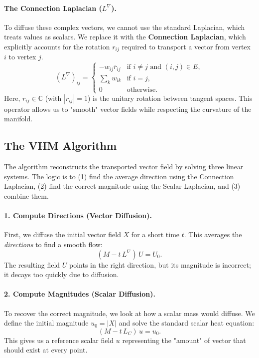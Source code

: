 \documentclass[11pt,a4paper]{article}
\begin{document}
\paragraph{The Connection Laplacian ($L^\nabla$).} 
To diffuse these complex vectors, we cannot use the standard Laplacian, which treats values as scalars. We replace it with the \textbf{Connection Laplacian}, which explicitly accounts for the rotation $r_{ij}$ required to transport a vector from vertex $i$ to vertex $j$.
\[
(L^{\nabla})_{ij} =
\begin{cases}
-w_{ij} \bar{r}_{ij} & \text{if } i \neq j \text{ and } (i,j) \in E,\\
\sum_{k} w_{ik} & \text{if } i=j,\\
0 & \text{otherwise}.
\end{cases}
\]
Here, $r_{ij} \in \mathbb{C}$ (with $|r_{ij}|=1$) is the unitary rotation between tangent spaces. This operator allows us to "smooth" vector fields while respecting the curvature of the manifold.

\subsection{The VHM Algorithm}

The algorithm reconstructs the transported vector field by solving three linear systems. The logic is to (1) find the average direction using the Connection Laplacian, (2) find the correct magnitude using the Scalar Laplacian, and (3) combine them.

\paragraph{1. Compute Directions (Vector Diffusion).}
First, we diffuse the initial vector field $X$ for a short time $t$. This averages the \textit{directions} to find a smooth flow:
\[
(M - t\,L^\nabla)\,U = U_0.
\]
The resulting field $U$ points in the right direction, but its magnitude is incorrect; it decays too quickly due to diffusion.

\paragraph{2. Compute Magnitudes (Scalar Diffusion).}
To recover the correct magnitude, we look at how a scalar mass would diffuse. We define the initial magnitude $u_0 = |X|$ and solve the standard scalar heat equation:
\[
(M - t\,L_C)\,u = u_0.
\]
This gives us a reference scalar field $u$ representing the "amount" of vector that should exist at every point.
\end{document}
